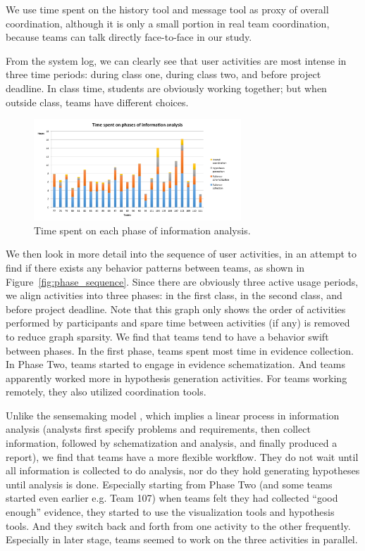 We use time spent on the history tool and message tool as proxy of overall coordination, although it is only a small portion in real team coordination, because teams can talk directly face-to-face in our study. 

From the system log, we can clearly see that user activities are most intense in three time periods: during class one, during class two, and before project deadline. In class time, students are obviously working together; but when outside class, teams have different choices. 


\begin{figure}
	\centering
	\includegraphics[height=1.5in]{img/phase_time}
	\caption{Time spent on each phase of information analysis.}
\end{figure}

We then look in more detail into the sequence of user activities, in an attempt to find if there exists any behavior patterns between teams, as shown in Figure~\ref{fig:phase_sequence}. Since there are obviously three active usage periods, we align activities into three phases: in the first class, in the second class, and before project deadline. Note that this graph only shows the order of activities performed by participants and spare time between activities (if any) is removed to reduce graph sparsity. We find that teams tend to have a behavior swift between phases. In the first phase, teams spent most time in evidence collection. In Phase Two, teams started to engage in evidence schematization. And teams apparently worked more in hypothesis generation activities. For teams working remotely, they also utilized coordination tools. 

Unlike the sensemaking model \cite{?}, which implies a linear process in information analysis (analysts first specify problems and requirements, then collect information, followed by schematization and analysis, and finally produced a report), we find that teams have a more flexible workflow. They do not wait until all information is collected to do analysis, nor do they hold generating hypotheses until analysis is done. Especially starting from Phase Two (and some teams started even earlier e.g. Team 107) when teams felt they had collected ``good enough'' evidence, they started to use the visualization tools and hypothesis tools. And they switch back and forth from one activity to the other frequently. Especially in later stage, teams seemed to work on the three activities in parallel.  

